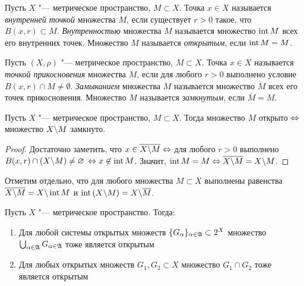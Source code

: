 \begin{definition}
	Пусть $X$ "--- метрическое пространство, $M \subset X$. Точка $x \in X$ назы\-вается \textit{внутренней точкой} множества $M$, если существует $r > 0$ такое, что $B(x, r) \subset M$. \textit{Внутренностью} множества $M$ называется множество $\operatorname{int}{M}$ всех его внутренних точек. Множество $M$ называется \textit{открытым}, если $\operatorname{int}{M} = M$.
\end{definition}

\begin{definition}
	Пусть $(X, \rho)$ "--- метрическое пространство, $M \subset X$. Точка $x \in X$ назы\-вается \textit{точкой прикосновения} множества $M$, если для любого $r > 0$ выполнено условие $B(x, r) \cap M \ne \emptyset$. \textit{Замыканием} множества $M$ называется множество $\overline M$ всех его точек прикосновения. Множество $M$ называется \textit{замкнутым}, если $\overline M = M$.
\end{definition}

\begin{theorem}\label{thm1.1}
	Пусть $X$ "--- метрическое пространство, $M \subset X$. Тогда множество $M$ открыто $\Leftrightarrow$ множество $X \backslash M$ замкнуто.
\end{theorem}

\begin{proof}
	Достаточно заметить, что $x \in \overline{X \backslash M} \Leftrightarrow$ для любого $r > 0$ выполнено $B(x, r) \cap (X \backslash M) \ne \varnothing$ $\Leftrightarrow x \not\in \operatorname{int}{M}$. Значит, $\operatorname{int} M = M\Leftrightarrow \overline{X \backslash M} = X \backslash M$.
\end{proof}

\begin{note}
	Отметим отдельно, что для любого множества $M \subset X$ выполнены равенства $\overline{X \backslash M} = X \backslash \operatorname{int} M$ и $\operatorname{int}{(X \backslash M)} = X \backslash \overline M$.
\end{note}

\begin{theorem}\label{thm1.2}
	Пусть $X$ "--- метрическое пространство. Тогда:
	\begin{enumerate}
		\item Для любой системы открытых множеств $\{G_\alpha\}_{\alpha \in \mathfrak A} \subset 2^X$ множество $\bigcup_{\alpha \in \mathfrak A} G_{\alpha \in \mathfrak A}$ тоже является открытым

		\item Для любых открытых множеств $G_1, G_2 \subset X$ множество $G_1 \cap G_2$ тоже является открытым
	\end{enumerate}
\end{theorem}

